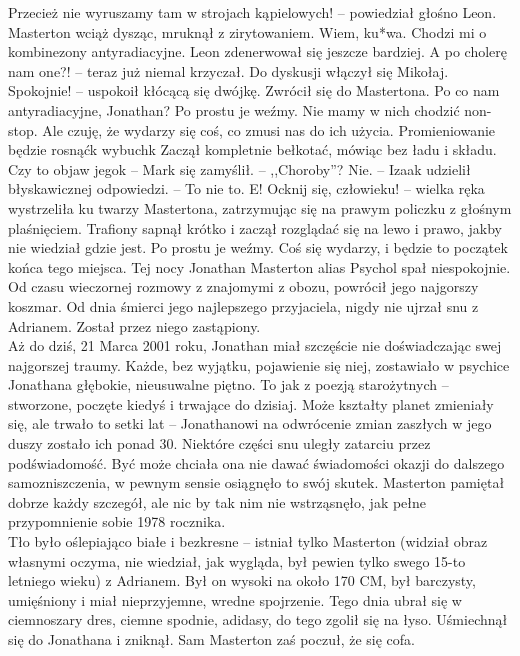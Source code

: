 \documentclass[../MAIN.tex]{subfiles}
\begin{document}
\xx Przecież nie wyruszamy tam w strojach kąpielowych! -- powiedział głośno Leon.
\qd
Masterton wciąż dysząc, mruknął z zirytowaniem.
\sx Wiem, ku*wa. Chodzi mi o kombinezony antyradiacyjne. \qd
Leon zdenerwował się jeszcze bardziej.
\sx A po cholerę nam one?! -- teraz już niemal krzyczał.
\qd
Do dyskusji włączył się Mikołaj.
\sx Spokojnie! -- uspokoił kłócącą się dwójkę. \qd
Zwrócił się do Mastertona.
\sx Po co nam antyradiacyjne, Jonathan?
\xx Po prostu je weźmy. Nie mamy w nich chodzić non-stop. Ale czuję, że wydarzy się coś, co zmusi nas do ich użycia. Promieniowanie będzie rosnąć\3k wybuch\3k
\qd
Zaczął kompletnie bełkotać, mówiąc bez ładu i składu.
\sx Czy to objaw jego\3k -- Mark się zamyślił. -- ,,Choroby''?
\xx Nie. -- Izaak udzielił błyskawicznej odpowiedzi. -- To nie to. E! Ocknij się, człowieku! -- wielka ręka wystrzeliła ku twarzy Mastertona, zatrzymując się na prawym policzku z głośnym plaśnięciem.
\qd
Trafiony sapnął krótko i zaczął rozglądać się na lewo i prawo, jakby nie wiedział gdzie jest.
\sx Po prostu je weźmy. Coś się wydarzy, i będzie to początek końca tego miejsca. \qd
%
%
Tej nocy Jonathan Masterton alias Psychol spał niespokojnie. Od czasu wieczornej rozmowy z znajomymi z obozu, powrócił jego najgorszy koszmar. Od dnia śmierci jego najlepszego przyjaciela, nigdy nie ujrzał snu z Adrianem. Został przez niego zastąpiony. \\
Aż do dziś, 21 Marca 2001 roku, Jonathan miał szczęście nie doświadczając swej najgorszej traumy. Każde, bez wyjątku, pojawienie się niej, zostawiało w psychice Jonathana głębokie, nieusuwalne piętno. To jak z poezją starożytnych -- stworzone, poczęte kiedyś i trwające do dzisiaj. Może kształty planet zmieniały się, ale trwało to setki lat -- Jonathanowi na odwrócenie zmian zaszłych w jego duszy zostało ich ponad 30.
Niektóre części snu uległy zatarciu przez podświadomość. Być może chciała ona nie dawać świadomości okazji do dalszego samozniszczenia, w pewnym sensie osiągnęło to swój skutek. Masterton pamiętał dobrze każdy szczegół, ale nic by tak nim nie wstrząsnęło, jak pełne przypomnienie sobie 1978 rocznika. \\
Tło było oślepiająco białe i bezkresne -- istniał tylko Masterton (widział obraz własnymi oczyma, nie wiedział, jak wygląda, był pewien tylko swego 15-to letniego wieku) z Adrianem. Był on wysoki na około 170 CM, był barczysty, umięśniony i miał nieprzyjemne, wredne spojrzenie. Tego dnia ubrał się w ciemnoszary dres, ciemne spodnie, adidasy, do tego zgolił się na łyso. Uśmiechnął się do Jonathana i zniknął. Sam Masterton zaś poczuł, że się cofa. \\
\end{document}
